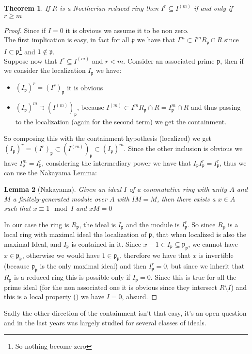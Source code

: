 \documentclass[a4wide]{book}
\theoremstyle{plain}
\newtheorem{teo}{Theorem}[section]
\newtheorem{lem}[teo]{Lemma}
\theoremstyle{remark}
\theoremstyle{definition}
\newcommand{\p}{\mathfrak{p}}
\newcounter{que}
\begin{document}
\begin{teo}\label{teo:inv_cont}
	If $ R $ is a Noetherian reduced ring then $ I^r \subseteq I^{(m)}$  if and only if $ r \geq m $
\end{teo}
\begin{proof}
	Since if $ I=0 $ it is obvious we assume it to be non zero.\\
	The first implication is easy, in fact for all $ \p $ we have that $ I^m \subset I^mR_\p \cap R $ since $ I \subset \p $\footnote{So nothing become zero} and $ 1 \not \in \p $.\\
	Suppose now that $ I^r \subseteq I^{(m)}$ and $ r < m $. Consider an associated prime $ \p $, then if we consider the localization $ I_\p $ we have:
	\begin{itemize}
	\item $ (I_\p)^r = (I^r)_\p $ it is obvious
	\item $ (I_\p)^m \supset (I^{(m)})_\p $, because $ I^{(m)} \subset I^mR_\p \cap R = I^m_\p \cap R $ and thus passing to the localization (again for the second term) we get the containment.
	\end{itemize}
	So composing this with the containment hypothesis (localized) we get $ (I_\p)^r = (I^r)_\p \subset (I^{(m)})_\p \subset (I_\p)^m $. Since the other inclusion is obvious we have $ I_\p^m= I_\p^r $, considering the intermediary power we have that $ I_\p I_\p^r =I_\p^r $, thus we can use the Nakayama Lemma:
	
	\begin{lem}[Nakayama] \label{lem:naka}
		Given an ideal $ I $ of a commutative ring with unity $ A $ and $ M $ a finitely-generated module over $ A $ with $ IM = M $, then there exists a $ x \in A $ such that $ x \equiv 1 \mod I $ and $ xM = 0 $
	\end{lem}
	In our case the ring is $ R_\p $, the ideal is $ I_\p $ and the module is $ I_\p^{r} $. So since $ R_p $ is a local ring with maximal ideal the localization of $ \p $, that when localized is also the maximal Ideal, and $ I_\p $ is contained in it. Since $ x -1 \in I_\p \subseteq \p_\p $, we cannot have $ x \in \p_\p $, otherwise we would have $ 1 \in \p_\p $, therefore we have that $ x $ is invertible (because $ \p_\p $ is the only maximal ideal) and then $ I_\p^r = 0 $, but since we inherit that $ R_\p $ is a reduced ring this is possible only if $ I_\p = 0$. Since this is true for all the prime ideal (for the non associated one it is obvious since they intersect $ R \setminus I $) and this is a local property (\cite[Proposition 3.8]{AMCD}) we have $ I = 0 $, absurd.
\end{proof} 
Sadly the other direction of the containment isn't that easy, it's an open question and in the last years was largely studied for several classes of ideals.
\end{document}
